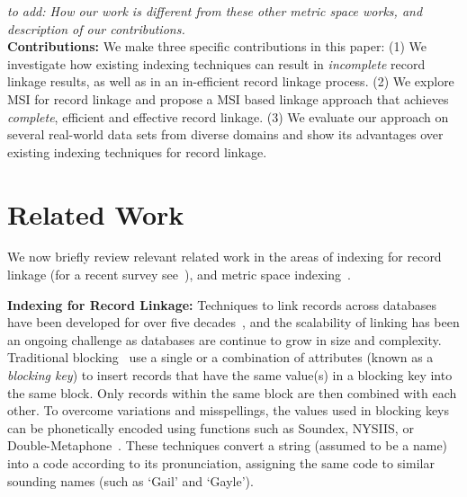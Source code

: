 \documentclass{llncs}
\begin{document}
\emph{to add: How our work is different from these other metric space works, and
description of our contributions.
}
~ \\

\smallskip
\textbf{Contributions:} We make three specific contributions in this
paper: (1) We investigate how existing indexing techniques can result
in \emph{incomplete} record linkage results, as well as in an
in-efficient record linkage process. (2) We explore MSI for record
linkage and propose a MSI based linkage approach that achieves
\emph{complete}, efficient and effective record linkage. (3) We
evaluate our approach on several real-world data sets from diverse
domains and show its advantages over existing indexing techniques for
record linkage.




%



\section{Related Work}
\label{sec-related}

We now briefly review relevant related work in the areas of indexing
for record linkage (for a recent survey see~\cite{Chr12b,Pap16}),
and metric space indexing~\cite{Zezula2010}.

\smallskip
\textbf{Indexing for Record Linkage:}
Techniques to link records across databases have been developed for
over five decades~\cite{Fel69,New59}, and the scalability of linking
has been an ongoing challenge as databases are continue to grow in
size and complexity. Traditional blocking~\cite{Chr12b} use a single
or a combination of attributes (known as a \emph{blocking key}) to
insert records that have the same value(s) in a blocking key into
the same block. Only records within the same block are then combined
with each other. To overcome variations and misspellings, the values
used in blocking keys can be phonetically encoded using functions
such as Soundex, NYSIIS, or Double-Metaphone~\cite{Chr12}. These
techniques convert a string (assumed to be a name) into a code
according to its pronunciation, assigning the same code to similar
sounding names (such as `Gail' and `Gayle').
\end{document}
